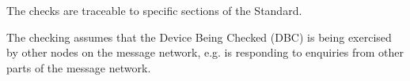 The checks are traceable to specific sections of the Standard.

The checking assumes that the Device Being Checked (DBC) is being exercised by other
nodes on the message network, 
e.g. is responding to enquiries from other parts of the message network.

